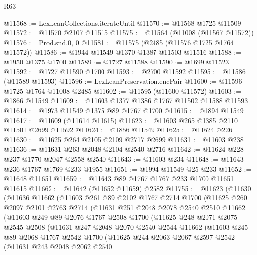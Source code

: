 \begin{lexlean}{R63}
\begin{coremodule}
@11568 := LexLeanCollections.iterateUntil
@11570 := @11568 @1725 @11509
@11572 := @11570 @2107 @11515
@11575 := @11564 (@11008 (@11567 @11572))
@11576 := Prod.snd.{0, 0}
@11581 := @11575 (@2485 (@11576 @1725 @1764 @11572))
@11586 := @1944 @11549 @1370 @1387 @11503 @11516
@11588 := @1950 @1375 @1700
@11589 := @1727 @11588
@11590 := @1699 @11523
@11592 := @1727 @11590 @1700
@11593 := @2700 @11592
@11595 := @11586 (@11589 @11593)
@11596 := LexLeanPreservation.encPair
@11600 := @11596 @1725 @1764 @11008 @2485
@11602 := @11595 (@11600 @11572)
@11603 := @1866 @11549
@11609 := @11603 @1377 @1386 @1767 @11502 @11588 @11593
@11614 := @1973 @11549 @1375 @89 @1767 @1700
@11615 := @1894 @11549
@11617 := @11609 (@11614 @11615)
@11623 := @11603 @265 @1385 @2110 @11501 @2699 @11592
@11624 := @1856 @11549
@11625 := @11624 @226
@11630 := @11625 @264 @2105 @2109 @2717 @2699
@11631 := @11603 @238
@11636 := @11631 @263 @2048 @2104 @2540 @2716
@11642 := @11624 @228 @237 @1770 @2047 @2558 @2540
@11643 := @11603 @234
@11648 := @11643 @236 @1767 @1769 @233 @1955
@11651 := @1994 @11549 @25 @233
@11652 := @11648 @11651
@11659 := @11643 @89 @1767 @1767 @233 @1700 @11651 @11615
@11662 := @11642 (@11652 @11659) @2582
@11755 := @11623
    (@11630
      (@11636
        @11662
        (@11603
          @261
          @89
          @2102
          @1767
          @2714
          @1700
          (@11625
            @260
            @2097
            @2101
            @2763
            @2714
            (@11631
              @251
              @2048
              @2078
              @2540
              @2510
              @11662
              (@11603
                @249
                @89
                @2076
                @1767
                @2508
                @1700
                (@11625
                  @248
                  @2071
                  @2075
                  @2545
                  @2508
                  (@11631
                    @247
                    @2048
                    @2070
                    @2540
                    @2544
                    @11662
                    (@11603
                      @245
                      @89
                      @2068
                      @1767
                      @2542
                      @1700
                      (@11625
                        @244
                        @2063
                        @2067
                        @2597
                        @2542
                        (@11631
                          @243
                          @2048
                          @2062
                          @2540

\end{coremodule}
\end{lexlean}
